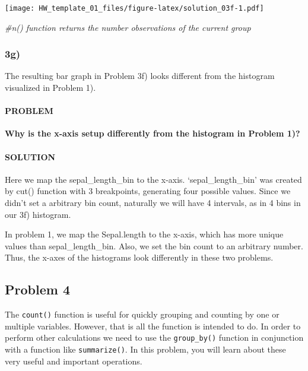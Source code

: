 \documentclass[]{article}
\newenvironment{Shaded}{\begin{snugshade}}{\end{snugshade}}
\newcommand{\CommentTok}[1]{\textcolor[rgb]{0.56,0.35,0.01}{\textit{#1}}}
\let\oldparagraph\paragraph
\renewcommand{\paragraph}[1]{\oldparagraph{#1}\mbox{}}
\begin{document}
\texttt{[image: HW\_template\_01\_files/figure-latex/solution\_03f-1.pdf]}

\begin{Shaded}
\begin{Highlighting}[]
  \CommentTok{#n() function returns the number observations of the current group}
\end{Highlighting}
\end{Shaded}

\hypertarget{g}{%
\subsubsection{3g)}\label{g}}

The resulting bar graph in Problem 3f) looks different from the
histogram visualized in Problem 1).

\hypertarget{problem-17}{%
\paragraph{PROBLEM}\label{problem-17}}

\textbf{Why is the x-axis setup differently from the histogram in
Problem 1)?}

\hypertarget{solution-16}{%
\paragraph{SOLUTION}\label{solution-16}}

Here we map the sepal\_length\_bin to the x-axis. `sepal\_length\_bin'
was created by cut() function with 3 breakpoints, generating four
possible values. Since we didn't set a arbitrary bin count, naturally we
will have 4 intervals, as in 4 bins in our 3f) histogram.

In problem 1, we map the Sepal.length to the x-axis, which has more
unique values than sepal\_length\_bin. Also, we set the bin count to an
arbitrary number. Thus, the x-axes of the histograms look differently in
these two problems.

\hypertarget{problem-4-1}{%
\subsection{Problem 4}\label{problem-4-1}}

The \texttt{count()} function is useful for quickly grouping and
counting by one or multiple variables. However, that is all the function
is intended to do. In order to perform other calculations we need to use
the \texttt{group\_by()} function in conjunction with a function like
\texttt{summarize()}. In this problem, you will learn about these very
useful and important operations.
\end{document}
